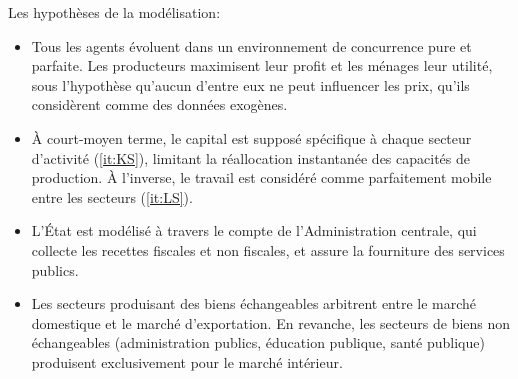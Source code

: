 \documentclass[11pt,a4paper]{article}
\begin{document}
	Les hypothèses de la modélisation:
	\begin{itemize}
		\item Tous les agents évoluent dans un environnement de concurrence pure et parfaite. Les producteurs maximisent leur profit et les ménages leur utilité, sous l'hypothèse qu'aucun d'entre eux ne peut influencer les prix, qu'ils considèrent comme des données exogènes.
		
		
		\item À court-moyen terme, le capital est supposé spécifique à chaque secteur d'activité (\ref{it:KS}), limitant la réallocation instantanée des capacités de production. À l'inverse, le travail est considéré comme parfaitement mobile entre les secteurs (\ref{it:LS}).
		
		
		\item L'État est modélisé à travers le compte de l'Administration centrale, qui collecte les recettes fiscales et non fiscales, et assure la fourniture des services publics.
		
		
		\item  Les secteurs produisant des biens échangeables arbitrent entre le marché domestique et le marché d'exportation. En revanche, les secteurs de biens non échangeables (administration publics, éducation publique, santé publique) produisent exclusivement pour le marché intérieur.
	\end{itemize} 
	
\end{document}
